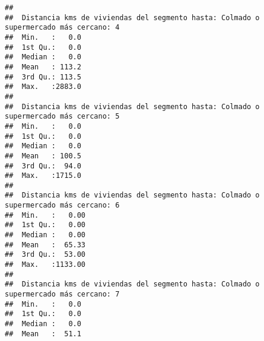 \documentclass[11pt,]{article}
\begin{document}
\begin{verbatim}
##                                                                                      
##  Distancia kms de viviendas del segmento hasta: Colmado o supermercado más cercano: 4
##  Min.   :   0.0                                                                      
##  1st Qu.:   0.0                                                                      
##  Median :   0.0                                                                      
##  Mean   : 113.2                                                                      
##  3rd Qu.: 113.5                                                                      
##  Max.   :2883.0                                                                      
##                                                                                      
##  Distancia kms de viviendas del segmento hasta: Colmado o supermercado más cercano: 5
##  Min.   :   0.0                                                                      
##  1st Qu.:   0.0                                                                      
##  Median :   0.0                                                                      
##  Mean   : 100.5                                                                      
##  3rd Qu.:  94.0                                                                      
##  Max.   :1715.0                                                                      
##                                                                                      
##  Distancia kms de viviendas del segmento hasta: Colmado o supermercado más cercano: 6
##  Min.   :   0.00                                                                     
##  1st Qu.:   0.00                                                                     
##  Median :   0.00                                                                     
##  Mean   :  65.33                                                                     
##  3rd Qu.:  53.00                                                                     
##  Max.   :1133.00                                                                     
##                                                                                      
##  Distancia kms de viviendas del segmento hasta: Colmado o supermercado más cercano: 7
##  Min.   :   0.0                                                                      
##  1st Qu.:   0.0                                                                      
##  Median :   0.0                                                                      
##  Mean   :  51.1                                                                      

\end{verbatim}
\end{document}
